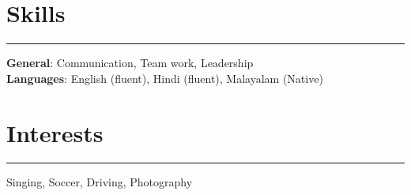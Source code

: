 \documentclass[11pt]{article}
\begin{document}
\section*{Skills}
\hrule
\textbf{General}: Communication, Team work, Leadership \\
\textbf{Languages}: English (fluent), Hindi (fluent), Malayalam (Native) \\ 

\vspace{-0.5\baselineskip}
\section*{Interests}
\hrule
Singing, Soccer, Driving, Photography
\end{document}
